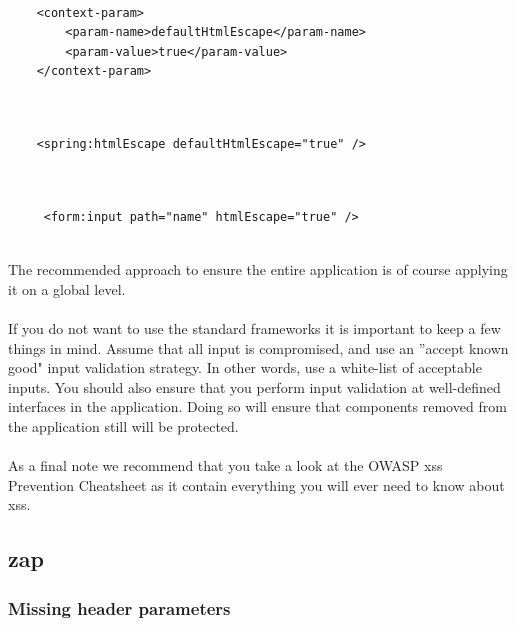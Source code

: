 \documentclass[11pt,english,a4paper]{report}
\begin{document}
\begin{lstlisting}[caption=Escape input in web.xml file, label=globallevel]

	<context-param>
		<param-name>defaultHtmlEscape</param-name>
		<param-value>true</param-value>
	</context-param>
	
\end{lstlisting}

\begin{lstlisting}[caption=Escape input on a page level, label=pagelevel]

	<spring:htmlEscape defaultHtmlEscape="true" />
		
\end{lstlisting}

\begin{lstlisting}[caption=Escape input on a specific input field, label=formlevel]

	 <form:input path="name" htmlEscape="true" />
	
\end{lstlisting}

The recommended approach to ensure the entire application is of course applying it on a global level.

\paragraph{}
If you do not want to use the standard frameworks it is important to keep a few things in mind.
Assume that all input is compromised, and use an ''accept known good" input validation strategy.
In other words, use a white-list of acceptable inputs.
You should also ensure that you perform input validation at well-defined interfaces in the application.
Doing so will ensure that components removed from the application still will be protected.

\paragraph{}
As a final note we recommend that you take a look at the OWASP \gls{xss} Prevention Cheatsheet\cite{cheatsheet} as it contain everything you will ever need to know about \gls{xss}. 

\subsection{\gls{zap}}

\subsubsection{Missing header parameters}
\end{document}

